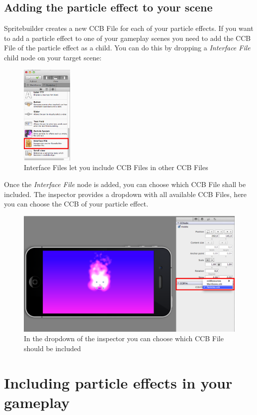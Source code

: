 \documentclass{scrreprt}
\begin{document}
\subsection{Adding the particle effect to your scene}
Spritebuilder creates a new CCB File for each of your particle effects. If you
want to add a particle effect to one of your gameplay scenes you need to add the
CCB File of the particle effect as a child. 
You can do this by dropping a \textit{Interface File} child node on your target
scene:
\begin{figure}[H]
		\centering
		\includegraphics[width=70pt]{images/particles/Spritebuilder_ParticleEffect_AddInterfaceFile.png}   
		\caption{Interface Files let you include CCB Files in other CCB Files}
\end{figure}
Once the \textit{Interface File} node is added, you can choose which CCB File
shall be included. The inspector provides a dropdown with all available CCB
Files, here you can choose the CCB of your particle effect.
 \begin{figure}[H]
		\centering
		\includegraphics[width=375pt]{images/particles/Spritebuilder_ParticleEffect_InterfaceFile.png}
		\caption{In the dropdown of the inspector you can choose which CCB File
		should be included}
\end{figure}
\section{Including particle effects in your gameplay}
 
\end{document}

